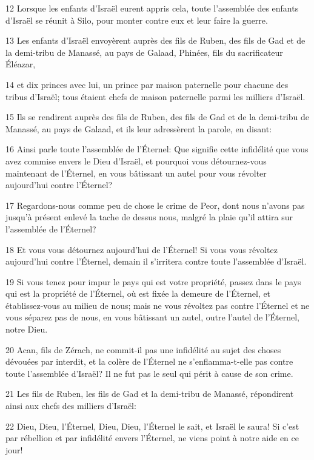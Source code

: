 \par 12 Lorsque les enfants d'Israël eurent appris cela, toute l'assemblée des enfants d'Israël se réunit à Silo, pour monter contre eux et leur faire la guerre.
\par 13 Les enfants d'Israël envoyèrent auprès des fils de Ruben, des fils de Gad et de la demi-tribu de Manassé, au pays de Galaad, Phinées, fils du sacrificateur Éléazar,
\par 14 et dix princes avec lui, un prince par maison paternelle pour chacune des tribus d'Israël; tous étaient chefs de maison paternelle parmi les milliers d'Israël.
\par 15 Ils se rendirent auprès des fils de Ruben, des fils de Gad et de la demi-tribu de Manassé, au pays de Galaad, et ils leur adressèrent la parole, en disant:
\par 16 Ainsi parle toute l'assemblée de l'Éternel: Que signifie cette infidélité que vous avez commise envers le Dieu d'Israël, et pourquoi vous détournez-vous maintenant de l'Éternel, en vous bâtissant un autel pour vous révolter aujourd'hui contre l'Éternel?
\par 17 Regardons-nous comme peu de chose le crime de Peor, dont nous n'avons pas jusqu'à présent enlevé la tache de dessus nous, malgré la plaie qu'il attira sur l'assemblée de l'Éternel?
\par 18 Et vous vous détournez aujourd'hui de l'Éternel! Si vous vous révoltez aujourd'hui contre l'Éternel, demain il s'irritera contre toute l'assemblée d'Israël.
\par 19 Si vous tenez pour impur le pays qui est votre propriété, passez dans le pays qui est la propriété de l'Éternel, où est fixée la demeure de l'Éternel, et établissez-vous au milieu de nous; mais ne vous révoltez pas contre l'Éternel et ne vous séparez pas de nous, en vous bâtissant un autel, outre l'autel de l'Éternel, notre Dieu.
\par 20 Acan, fils de Zérach, ne commit-il pas une infidélité au sujet des choses dévouées par interdit, et la colère de l'Éternel ne s'enflamma-t-elle pas contre toute l'assemblée d'Israël? Il ne fut pas le seul qui périt à cause de son crime.
\par 21 Les fils de Ruben, les fils de Gad et la demi-tribu de Manassé, répondirent ainsi aux chefs des milliers d'Israël:
\par 22 Dieu, Dieu, l'Éternel, Dieu, Dieu, l'Éternel le sait, et Israël le saura! Si c'est par rébellion et par infidélité envers l'Éternel, ne viens point à notre aide en ce jour!
